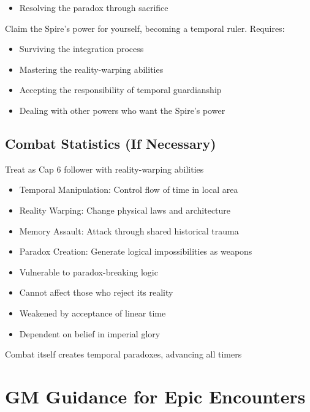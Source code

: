 \documentclass[11pt]{article}
\begin{document}
\begin{description}[leftmargin=*]
\begin{itemize}
\item Resolving the paradox through sacrifice
\end{itemize}
\item[The Conquest] Claim the Spire's power for yourself, becoming a temporal ruler. Requires:
\begin{itemize}
\item Surviving the integration process
\item Mastering the reality-warping abilities
\item Accepting the responsibility of temporal guardianship
\item Dealing with other powers who want the Spire's power
\end{itemize}
\end{description}

\subsection*{Combat Statistics (If Necessary)}

\begin{description}[leftmargin=*]
\item[Scale] Treat as Cap 6 follower with reality-warping abilities
\item[Special Abilities]
\begin{itemize}
\item Temporal Manipulation: Control flow of time in local area
\item Reality Warping: Change physical laws and architecture
\item Memory Assault: Attack through shared historical trauma
\item Paradox Creation: Generate logical impossibilities as weapons
\end{itemize}
\item[Weaknesses]
\begin{itemize}
\item Vulnerable to paradox-breaking logic
\item Cannot affect those who reject its reality
\item Weakened by acceptance of linear time
\item Dependent on belief in imperial glory
\end{itemize}
\item[Consequences] Combat itself creates temporal paradoxes, advancing all timers
\end{description}

\section*{GM Guidance for Epic Encounters}
\end{document}
